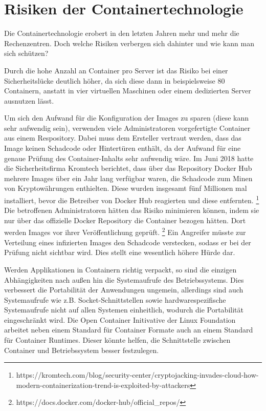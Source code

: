 \section{Risiken der Containertechnologie}
\label{sec:Risiken der Containertechnologie}
Die Containertechnologie erobert in den letzten Jahren mehr und mehr die Rechenzentren. Doch welche Risiken verbergen sich dahinter und wie kann man sich schützen?

Durch die hohe Anzahl an Container pro Server ist das Risiko bei einer Sicherheitslücke deutlich höher, da sich diese dann in beispielsweise 80 Containern, anstatt in vier virtuellen Maschinen oder einem dedizierten Server ausnutzen lässt.\cite{Risiken}

Um sich den Aufwand für die Konfiguration der Images zu sparen (diese kann sehr aufwendig sein), verwenden viele Administratoren vorgefertigte Container aus einem Respository.
Dabei muss dem Ersteller vertraut werden, dass das Image keinen Schadcode oder Hintertüren enthält, da der Aufwand für eine genaue Prüfung des Container-Inhalts sehr aufwendig wäre.
Im Juni 2018 hatte die Sicherheitsfirma Kromtech berichtet, dass über das Repository Docker Hub mehrere Images über ein Jahr lang verfügbar waren, die Schadcode zum Minen von Kryptowährungen enthielten.
Diese wurden insgesamt fünf Millionen mal installiert, bevor die Betreiber von Docker Hub reagierten und diese entfernten.
\footnote{https://kromtech.com/blog/security-center/cryptojacking-invades-cloud-how-modern-containerization-trend-is-exploited-by-attackers}
Die betroffenen Administratoren hätten das Risiko minimieren können, indem sie nur über das offizielle Docker Repository die Container bezogen hätten.
Dort werden Images vor ihrer Veröffentlichung geprüft.
\footnote{https://docs.docker.com/docker-hub/official\_repos/}
Ein Angreifer müsste zur Verteilung eines infizierten Images den Schadcode verstecken, sodass er bei der Prüfung nicht sichtbar wird. Dies stellt eine wesentlich höhere Hürde dar.

Werden Applikationen in Containern richtig verpackt, so sind die einzigen Abhängigkeiten nach außen hin die Systemaufrufe des Betriebssystems.
Dies verbessert die Portabilität der Anwendungen ungemein, allerdings sind auch Systemaufrufe wie z.B. Socket-Schnittstellen sowie hardwarespezifische Systemaufrufe nicht auf allen Systemen einheitlich, wodurch die Portabilität eingeschränkt wird.
Die Open Container Initivative der Linux Foundation arbeitet neben einem Standard für Container Formate auch an einem Standard für Container Runtimes.
Dieser könnte helfen, die Schnittstelle zwischen Container und Betriebssystem besser festzulegen.

